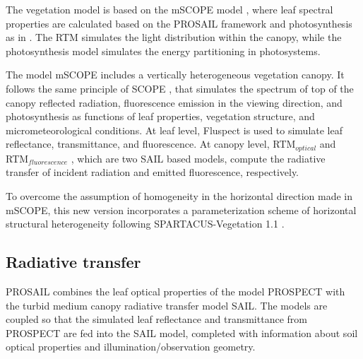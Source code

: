 \documentclass{article}
\begin{document}


The vegetation model is based on the mSCOPE model \citep{Yang2017}, where leaf spectral properties are calculated based on the PROSAIL framework \citep{Jacquemoud2009} and photosynthesis as in \citet{Farquhar1980}. The RTM simulates the light distribution within the canopy, while the photosynthesis model simulates the energy partitioning in photosystems.

The model mSCOPE includes a vertically heterogeneous vegetation canopy. It follows the same principle of SCOPE \citep{VanderTol2009}, that simulates the spectrum of top of the canopy reflected radiation, fluorescence emission in the viewing direction, and photosynthesis as functions of leaf properties, vegetation structure, and micrometeorological conditions. %
At leaf level, Fluspect \citep{Vilfan2016} is used to simulate leaf reflectance, transmittance, and fluorescence. At canopy level, RTM$_{optical}$ and RTM$_{fluorescence}$ \citep{VanderTol2016}, which are two SAIL \citep{Verhoef1984,Verhoef1985} based models, compute the radiative transfer of incident radiation and emitted fluorescence, respectively. 

To overcome the assumption of homogeneity in the horizontal direction made in mSCOPE, this new version incorporates a parameterization scheme of horizontal structural heterogeneity following SPARTACUS-Vegetation 1.1 \citep{Hogan2018}.

\subsection{Radiative transfer}




PROSAIL combines the leaf optical properties of the model PROSPECT \citep{Jacquemoud1990,Feret2017} with the turbid medium canopy radiative transfer model SAIL. The models are coupled so that the simulated leaf reflectance and transmittance from PROSPECT are fed into the SAIL model, completed with information about soil optical properties and illumination/observation geometry.
\end{document}
